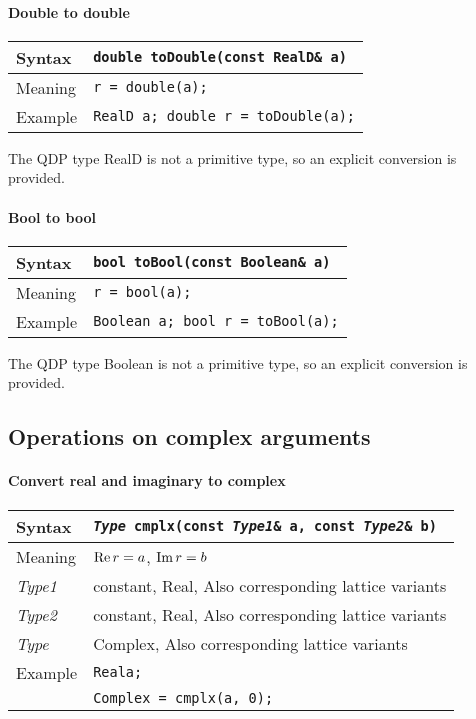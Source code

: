 \documentclass[12pt,letterpaper]{article}
\renewcommand{\Re}{\mathop{\rm Re}}
\renewcommand{\Im}{\mathop{\rm Im}}
\newcommand{\tConstant}{constant}
\newcommand{\tReal}{Real}
\newcommand{\tComplex}{Complex}
\newcommand{\tBoolean}{Boolean}
\newcommand{\tRealD}{RealD}
\newcommand{\simLatticeVariants}{Also corresponding lattice variants}
\newcommand{\protoBinaryQual}[1]{{\tt {\it Type} #1(const {\it Type1}\& a, const {\it Type2}\& b)}}
\begin{document}
\paragraph{Double to double} 

\begin{flushleft}
  \begin{tabular}{|l|l|}
  \hline
  Syntax      & {\tt double toDouble(const \tRealD\& a)} \\
  \hline
  Meaning     & \verb|r = double(a);|\\
  \hline
  Example     & {\tt \tRealD{} a; double r = toDouble(a);} \\
  \hline
  \end{tabular}
\end{flushleft}

The QDP type \tRealD{} is not a primitive type, so an explicit conversion is provided.

\paragraph{Bool to bool} 

\begin{flushleft}
  \begin{tabular}{|l|l|}
  \hline
  Syntax      & {\tt bool toBool(const \tBoolean\& a)} \\
  \hline
  Meaning     & \verb|r = bool(a);|\\
  \hline
  Example     & {\tt \tBoolean{} a; bool r = toBool(a);} \\
  \hline
  \end{tabular}
\end{flushleft}

The QDP type \tBoolean{} is not a primitive type, so an explicit conversion is provided.

\subsection{Operations on complex arguments}

\paragraph{Convert real and imaginary to complex}

\begin{flushleft}
  \begin{tabular}{|l|l|}
  \hline
  Syntax      & \protoBinaryQual{cmplx} \\
  \hline
  Meaning     & $\Re r = a$, $\Im r = b$ \\
  \hline
  {\it Type1} & \tConstant, \tReal, \simLatticeVariants\\
  {\it Type2} & \tConstant, \tReal, \simLatticeVariants\\
  \hline
  {\it Type}  & \tComplex, \simLatticeVariants\\
  \hline
  Example     & {\tt \tReal a;}\\
              & {\tt \tComplex{} = cmplx(a, 0);}\\
  \hline
  \end{tabular}
\end{flushleft}
\end{document}
